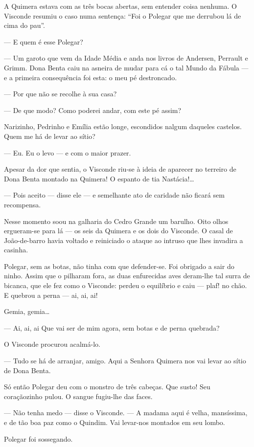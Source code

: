 A Quimera estava com as três bocas abertas, sem entender coisa nenhuma.
O Visconde resumiu o caso numa sentença: ``Foi o Polegar que me derrubou
lá de cima do pau''.

--- E quem é esse Polegar?

--- Um garoto que vem da Idade Média e anda nos livros de Andersen,
Perrault e Grimm. Dona Benta caiu na asneira de mudar para cá o tal
Mundo da Fábula --- e a primeira consequência foi esta: o meu pé
destroncado.

--- Por que não se recolhe à sua casa?

--- De que modo? Como poderei andar, com este pé assim?

Narizinho, Pedrinho e Emília estão longe, escondidos nalgum daqueles
castelos. Quem me há de levar ao sítio?

--- Eu. Eu o levo --- e com o maior prazer.

Apesar da dor que sentia, o Visconde riu-se à ideia de aparecer no
terreiro de Dona Benta montado na Quimera! O espanto de tia
Nastácia!\ldots{}

--- Pois aceito --- disse ele --- e semelhante ato de caridade não
ficará sem recompensa.

Nesse momento soou na galharia do Cedro Grande um barulho. Oito olhos
ergueram-se para lá --- os seis da Quimera e os dois do Visconde. O
casal de João-de-barro havia voltado e reiniciado o ataque ao intruso
que lhes invadira a casinha.

Polegar, sem as botas, não tinha com que defender-se. Foi obrigado a
sair do ninho. Assim que o pilharam fora, as duas enfurecidas aves
deram-lhe tal surra de bicanca, que ele fez como o Visconde: perdeu o
equilíbrio e caiu --- plaf! no chão. E quebrou a perna --- ai, ai, ai!

Gemia, gemia\ldots{}

--- Ai, ai, ai Que vai ser de mim agora, sem botas e de perna quebrada?

O Visconde procurou acalmá-lo.

--- Tudo se há de arranjar, amigo. Aqui a Senhora Quimera nos vai levar
ao sítio de Dona Benta.

Só então Polegar deu com o monstro de três cabeças. Que susto! Seu
coraçãozinho pulou. O sangue fugiu-lhe das faces.

--- Não tenha medo --- disse o Visconde. --- A madama aqui é velha,
mansíssima, e de tão boa paz como o Quindim. Vai levar-nos montados em
seu lombo.

Polegar foi sossegando.

